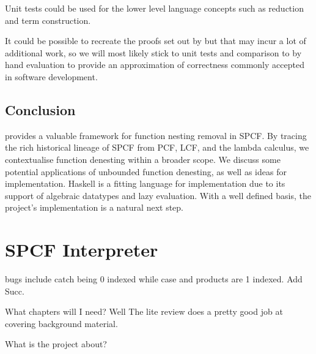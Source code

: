 \documentclass[12pt,a4paper]{report}
\theoremstyle{definition}
\theoremstyle{remark}
\begin{document}
Unit tests could be used for the lower level language concepts such as reduction and term construction.

It could be possible to recreate the proofs set out by \cite{laird_2007} but that may incur a lot of additional work, so we will most likely stick to unit tests and comparison to by hand evaluation to provide an approximation of correctness commonly accepted in software development.

\section{Conclusion}
\cite{laird_2007} provides a valuable framework for function nesting removal in SPCF. By tracing the rich historical lineage of SPCF from PCF, LCF, and the lambda calculus, we contextualise function denesting within a broader scope. We discuss some potential applications of unbounded function denesting, as well as ideas for implementation. Haskell is a fitting language for implementation due to its support of algebraic datatypes and lazy evaluation. With a well defined basis, the project's implementation is a natural next step.

\chapter{SPCF Interpreter}\label{chapter: interpreter}

bugs include catch being 0 indexed while case and products are 1 indexed. Add Succ.

What chapters will I need?
Well The lite review does a pretty good job at covering background material.

What is the project about?
\end{document}
